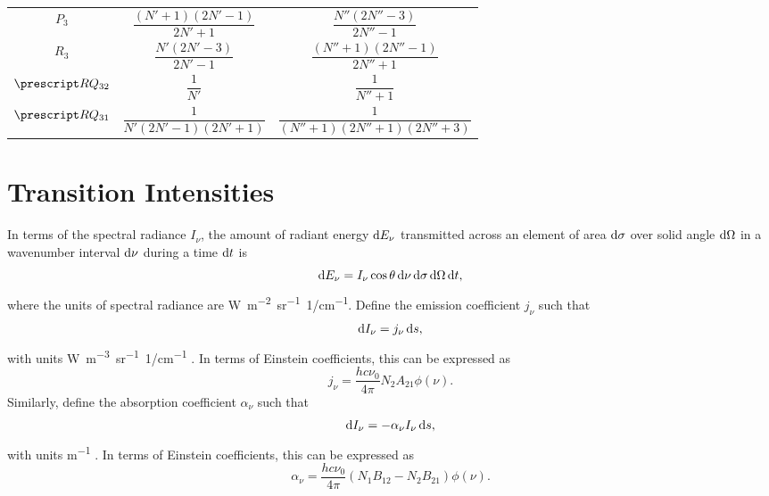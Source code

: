 \begin{table}[H]
\begin{tabular}{ccc}
        $P_3$             & $\dfrac{(N' + 1)(2N' - 1)}{2N' + 1}$    & $\dfrac{N''(2N'' - 3)}{2N'' - 1}$          \\
        \addlinespace[0.5em]
        $R_3$             & $\dfrac{N'(2N' - 3)}{2N' - 1}$          & $\dfrac{(N'' + 1)(2N'' - 1)}{2N'' + 1}$    \\
        \addlinespace[0.5em]
        $\state{R}{Q}_{32}$ & $\dfrac{1}{N'}$                         & $\dfrac{1}{N'' + 1}$                       \\
        \addlinespace[0.5em]
        $\state{R}{Q}_{31}$ & $\dfrac{1}{N'(2N' - 1)(2N' + 1)}$       & $\dfrac{1}{(N'' + 1)(2N'' + 1)(2N'' + 3)}$ \\
        \bottomrule
    \end{tabular}
\end{table}

\section{Transition Intensities}

In terms of the spectral radiance $I_\nu$, the amount of radiant energy $\odif{E_\nu}$ transmitted across an element of area $\odif{\sigma}$ over solid angle $\odif{\Omega}$ in a wavenumber interval $\odif{\nu}$ during a time $\odif{t}$ is \cite[1]{chandrasekharRadiativeTransfer2016}
\begin{equation*}
    \odif{E_\nu} = I_\nu\cos\theta\odif{\nu}\odif{\sigma}\odif{\Omega}\odif{t},
\end{equation*}
where the units of spectral radiance are \unit{W.m^{-2}.sr^{-1}.1/cm^{-1}}.
Define the emission coefficient $j_\nu$ such that
\begin{equation*}
    \odif{I_\nu} = j_\nu\odif{s},
\end{equation*}
with units \unit{W.m^{-3}.sr^{-1}.1/cm^{-1}} \cite[9]{rybickiRadiativeProcessesAstrophysics2004}.
In terms of Einstein coefficients, this can be expressed as \cite[31]{rybickiRadiativeProcessesAstrophysics2004}
\begin{equation*}
    j_\nu = \frac{hc\nu_0}{4\pi}N_2A_{21}\phi(\nu).
\end{equation*}
Similarly, define the absorption coefficient $\alpha_\nu$ such that
\begin{equation*}
    \odif{I_\nu} = -\alpha_\nu I_\nu\odif{s},
\end{equation*}
with units \unit{m^{-1}} \cite[10]{rybickiRadiativeProcessesAstrophysics2004}.
In terms of Einstein coefficients, this can be expressed as \cite[31]{rybickiRadiativeProcessesAstrophysics2004}
\begin{equation*}
    \alpha_\nu = \frac{hc\nu_0}{4\pi}(N_1B_{12} - N_2B_{21})\phi(\nu).
\end{equation*}

